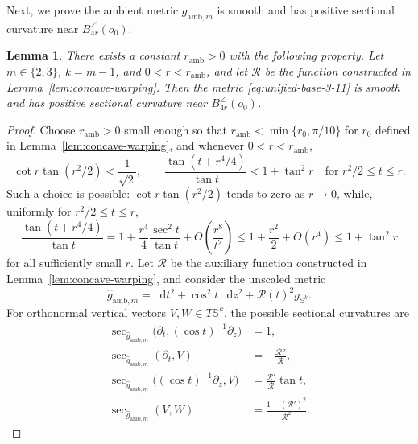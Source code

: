 \documentclass[11pt,reqno]{amsart}
\newtheorem{lemma}[theorem]{Lemma}
\theoremstyle{definition}
\numberwithin{equation}{section}
\newcommand{\dd}{\mathop{}\!\mathrm d}
\begin{document}
Next, we prove the ambient metric $g_{\mathrm{amb},m}$ is smooth and has positive sectional curvature near
\(B_{4r}^{\angle}(o_0)\).
\begin{lemma}
\label{lem:neck-ambient-curvature}
There exists a constant \(r_{\mathrm{amb}}>0\) with the following
property.  Let \(m\in\{2,3\}\), \(k=m-1\), and
\(0<r<r_{\mathrm{amb}}\), and let \(\mathcal R\) be the function
constructed in Lemma~\ref{lem:concave-warping}.  Then the metric
\eqref{eq:unified-base-3-11} is smooth and has positive sectional curvature near
\(B_{4r}^{\angle}(o_0)\).
\end{lemma}

\begin{proof}
Choose $r_{\mathrm{amb}}>0$ small enough so that $r_{\mathrm{amb}}<\min\{r_0, \pi/10\}$ for $r_0$ defined in Lemma~\ref{lem:concave-warping}, and whenever
 $0<r<r_{\mathrm{amb}}$,
\begin{equation}
\cot r\tan(r^2/2)<\frac1{\sqrt2},\qquad
 \frac{\tan(t+r^4/4)}{\tan t}<1+\tan^2r
 \quad\text{for }r^2/2\le t\le r.                                  \label{eq:unified-base-3-14}
\end{equation}
Such a choice is possible: \(\cot r\tan(r^2/2)\) tends to zero as
\(r\to0\), while, uniformly for \(r^2/2\le t\le r\),
\[
\frac{\tan(t+r^4/4)}{\tan t}
 =1+\frac{r^4}{4}\frac{\sec^2t}{\tan t}
  +O\!\left(\frac{r^8}{t^2}\right)
 \le1+\frac{r^2}{2}+O(r^4)
 \le1+\tan^2r
\]
for all sufficiently small \(r\).  Let \(\mathcal R\) be the auxiliary function constructed in
Lemma~\ref{lem:concave-warping}, and consider the unscaled
metric
\[
 \widehat g_{\mathrm{amb},m}
 =\dd t^2+\cos^2t\,\dd z^2+\mathcal R(t)^2g_{\mathbb S^k}.
\]
For orthonormal vertical vectors $V,W\in T\mathbb S^k$, the possible
sectional curvatures are
\begin{align}
 \sec_{\widehat g_{\mathrm{amb},m}}
   \bigl(\partial_t,(\cos t)^{-1}\partial_z\bigr)&=1,             \label{eq:unified-base-3-15}\\
 \sec_{\widehat g_{\mathrm{amb},m}}(\partial_t,V)
   &=-\frac{\mathcal R''}{\mathcal R},                            \label{eq:unified-base-3-16}\\
 \sec_{\widehat g_{\mathrm{amb},m}}
   \bigl((\cos t)^{-1}\partial_z,V\bigr)
 &=\frac{\mathcal R'}{\mathcal R}\tan t,                         \label{eq:unified-base-3-17}\\
 \sec_{\widehat g_{\mathrm{amb},m}}(V,W)
   &=\frac{1-(\mathcal R')^2}{\mathcal R^2}.                     \label{eq:unified-base-3-18}
\end{align}

\end{proof}
\end{document}
